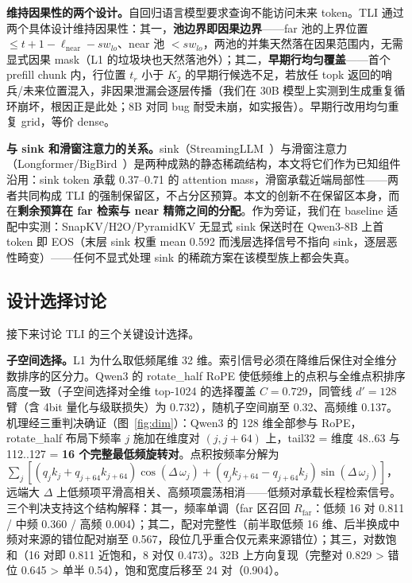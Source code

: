 \documentclass[11pt]{article}
\begin{document}
\textbf{维持因果性的两个设计。}自回归语言模型要求查询不能访问未来 token。TLI 通过两个具体设计维持因果性：其一，\textbf{池边界即因果边界}——far 池的上界位置 $\leq t+1-\ell_{\mathrm{near}}-sw_{lo}$、near 池 $< sw_{lo}$，两池的并集天然落在因果范围内，无需显式因果 mask（L1 的垃圾块也天然落池外）；其二，\textbf{早期行均匀覆盖}——首个 prefill chunk 内，行位置 $t_r$ 小于 $K_2$ 的早期行候选不足，若放任 topk 返回的哨兵/未来位置混入，非因果泄漏会逐层传播（我们在 30B 模型上实测到生成重复循环崩坏，根因正是此处；8B 对同 bug 耐受未崩，如实报告）。早期行改用均匀重复 grid，等价 dense。

\textbf{与 sink 和滑窗注意力的关系。}sink（StreamingLLM~\cite{streamingllm}）与滑窗注意力（Longformer/BigBird~\cite{longformer,bigbird}）是两种成熟的静态稀疏结构，本文将它们作为已知组件沿用：sink token 承载 0.37--0.71 的 attention mass，滑窗承载近端局部性——两者共同构成 TLI 的强制保留区，不占分区预算。本文的创新不在保留区本身，而在\textbf{剩余预算在 far 检索与 near 精筛之间的分配}。作为旁证，我们在 baseline 适配中实测：SnapKV/H2O/PyramidKV 无显式 sink 保送时在 Qwen3-8B 上首 token 即 EOS（末层 sink 权重 mean 0.592 而浅层选择信号不指向 sink，逐层恶性畸变）——任何不显式处理 sink 的稀疏方案在该模型族上都会失真。

\subsection{设计选择讨论}

接下来讨论 TLI 的三个关键设计选择。

\textbf{子空间选择。}L1 为什么取低频尾维 32 维。索引信号必须在降维后保住对全维分数排序的区分力。Qwen3 的 rotate\_half RoPE 使低频维上的点积与全维点积排序高度一致（子空间选择对全维 top-1024 的选择覆盖 $C{=}0.729$，同管线 $d'{=}128$ 臂（含 4bit 量化与级联损失）为 0.732），随机子空间崩至 0.32、高频维 0.137。机理经三重判决确证（图~\ref{fig:dim}）：Qwen3 的 128 维全部参与 RoPE，rotate\_half 布局下频率 $j$ 施加在维度对 $(j, j{+}64)$ 上，tail32 = 维度 48..63 与 112..127 = \textbf{16 个完整最低频旋转对}。点积按频率分解为 $\sum_j [(q_j k_j + q_{j+64} k_{j+64})\cos(\Delta\,\omega_j) + (q_j k_{j+64} - q_{j+64} k_j)\sin(\Delta\,\omega_j)]$，远端大 $\Delta$ 上低频项平滑高相关、高频项震荡相消——低频对承载长程检索信号。三个判决支持这个结构解释：其一，频率单调（far 区召回 $R_{\mathrm{far}}$：低频 16 对 0.811 / 中频 0.360 / 高频 0.004）；其二，配对完整性（前半取低频 16 维、后半换成中频对来源的错位配对崩至 0.567，段位几乎重合仅元素来源错位）；其三，对数饱和（16 对即 0.811 近饱和，8 对仅 0.473）。32B 上方向复现（完整对 0.829 > 错位 0.645 > 单半 0.54），饱和宽度后移至 24 对（0.904）。
\end{document}
